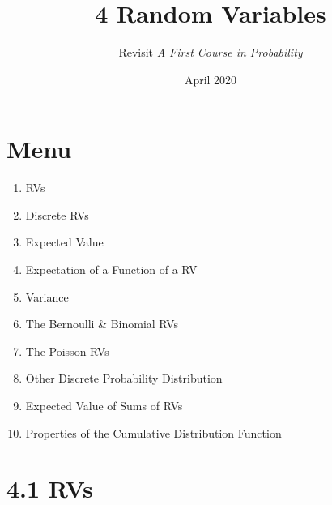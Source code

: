 \documentclass{article}
\title{4 Random Variables}
\author{Revisit \emph{A First Course in Probability}}
\date{April 2020}
\begin{document}
\maketitle

\section*{Menu}
\begin{enumerate}
\item  RVs
\item  Discrete RVs
\item  Expected Value
\item  Expectation of a Function of a RV
\item  Variance
\item  The Bernoulli & Binomial RVs
\item  The Poisson RVs 
\item  Other Discrete Probability Distribution
\item  Expected Value of Sums of RVs
\item  Properties of the Cumulative Distribution Function 
\end{enumerate}


\section*{4.1 RVs}






\end{document}
